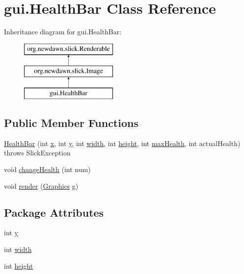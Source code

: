 \hypertarget{classgui_1_1_health_bar}{}\section{gui.\+Health\+Bar Class Reference}
\label{classgui_1_1_health_bar}
Inheritance diagram for gui.\+Health\+Bar\+:\begin{figure}[H]
\begin{center}
\leavevmode
\includegraphics[height=3.000000cm]{classgui_1_1_health_bar}
\end{center}
\end{figure}
\subsection*{Public Member Functions}
\begin{DoxyCompactItemize}
\item 
\mbox{\hyperlink{classgui_1_1_health_bar_a5f226ed0f456c4278c6c8eb0c927acc8}{Health\+Bar}} (int \mbox{\hyperlink{classgui_1_1_health_bar_a8895162adfc4ba2fc6d4b324b8460d20}{x}}, int \mbox{\hyperlink{classgui_1_1_health_bar_a330c927f65420a456814ef5bb30b5c9f}{y}}, int \mbox{\hyperlink{classgui_1_1_health_bar_aefb7e95b9777d9bd70b457a0355ddeb7}{width}}, int \mbox{\hyperlink{classgui_1_1_health_bar_a5afdc634dd91432fb9829d3441d1a4aa}{height}}, int \mbox{\hyperlink{classgui_1_1_health_bar_a140d4fec43b960a1ba75f3e767501e6f}{max\+Health}}, int actual\+Health)  throws Slick\+Exception
\item 
void \mbox{\hyperlink{classgui_1_1_health_bar_a4e51c8bf35eb0db3d98f2bad5d236890}{change\+Health}} (int num)
\item 
void \mbox{\hyperlink{classgui_1_1_health_bar_a9c40e5b00050d6264dae96d7054fab06}{render}} (\mbox{\hyperlink{classorg_1_1newdawn_1_1slick_1_1_graphics}{Graphics}} g)
\end{DoxyCompactItemize}
\subsection*{Package Attributes}
\begin{DoxyCompactItemize}
\item 
int \mbox{\hyperlink{classgui_1_1_health_bar_a330c927f65420a456814ef5bb30b5c9f}{y}}
\item 
int \mbox{\hyperlink{classgui_1_1_health_bar_aefb7e95b9777d9bd70b457a0355ddeb7}{width}}
\item 
int \mbox{\hyperlink{classgui_1_1_health_bar_a5afdc634dd91432fb9829d3441d1a4aa}{height}}
\end{DoxyCompactItemize}
